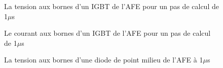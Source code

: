 \begin{figure}[htb]
\caption{La tension aux bornes d'un IGBT de l'AFE pour un pas de calcul de 1$\mu$s}
\label{AF_DC_IGBT1}
\end{figure}


\begin{figure}[htb]
\caption{Le courant aux bornes d'un IGBT de l'AFE pour un pas de calcul de 1$\mu$s}
\label{AF_DC_IGBT2}
\end{figure}


\begin{figure}[htb]
\caption{La tension aux bornes d'une diode de point milieu de l'AFE à 1$\mu$s}
\label{AF_DC_DI1}
\end{figure}


